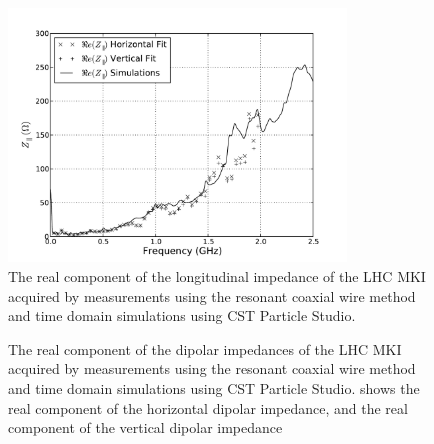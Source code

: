 \begin{figure}
\begin{center}
\includegraphics[width=0.8\textwidth]{LHC_MKI/figures/mki_15_sims_meas_long.pdf}
\end{center}
\caption{The real component of the longitudinal impedance of the LHC MKI acquired by measurements using the resonant coaxial wire method and time domain simulations using CST Particle Studio.}
\label{fig:mki-15-longitudinal}
\end{figure}

\begin{figure}
\caption{The real component of the dipolar impedances of the LHC MKI acquired by measurements using the resonant coaxial wire method and time domain simulations using CST Particle Studio.  shows the real component of the horizontal dipolar impedance, and  the real component of the vertical dipolar impedance}
\label{fig:mki-15-dipolar}
\end{figure}

